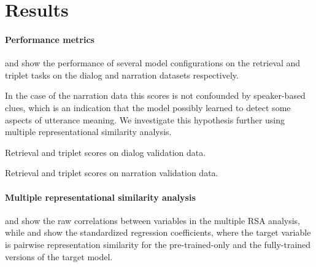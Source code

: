 \section{Results}
\label{sec:results}
\paragraph{Performance metrics}
 and  show
the performance of several model configurations on the retrieval and
triplet tasks on the dialog and narration datasets respectively.

In the case of the narration data this scores is not confounded by
speaker-based clues, which is an indication that the model possibly
learned to detect some aspects of utterance meaning. We investigate
this hypothesis further using multiple representational similarity
analysis.
 

 \begin{table}
   \centering
   
   \caption{Retrieval and triplet scores on dialog validation data.}
   \label{tab:scores-dialog}
 \end{table}

\begin{table}
   \centering
   
   \caption{Retrieval and triplet scores on narration validation data.}
   \label{tab:scores-narration}
 \end{table}
 
 
\paragraph{Multiple representational similarity analysis}

 and  show the raw
correlations between variables in the multiple RSA analysis, while
 and  show the
standardized regression coefficients, where the target variable is
pairwise representation similarity for the pre-trained-only and the
fully-trained versions of the target model.

